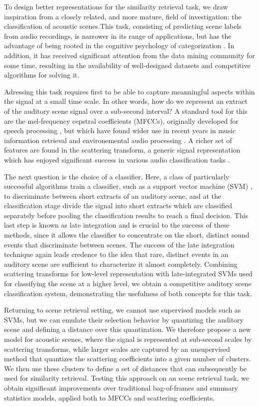 \documentclass[journal]{IEEEtran}
\begin{document}
To design better representations for the similarity retrieval task, we draw inspiration from a closely related, and more mature, field of investigation: the classification of acoustic scenes.This task, consisting of predicting scene labels from audio recordings, is narrower in its range of applications, but has the advantage of being rooted in the cognitive psychology of categorization \cite{dubois2006cognitive,guastavino_ideal_2006}. In addition, it has received significant attention from the data mining community for some time, resulting in the availability of well-designed datasets and competitive algorithms for solving it.

Adressing this task requires first to be able to capture meanningful aspects within the signal at a small time scale. In other words, how do we represent an extract of the auditory scene signal over a sub-second interval? A standard tool for this are the mel-frequency cepstral coefficients (MFCCs), originally developed for speech processing \cite{davis-mermelstein}, but which have found wider use in recent years in music information retrieval \cite{logan} and environemental audio processing \cite{aucouturier2007bag}. A richer set of features are found in the scattering transform, a generic signal representation which has enjoyed significant success in various audio classification tasks \cite{Anden2014}.

The next question is the choice of a classifier. Here, a class of particularly successful algorithms train a classifier, such as a support vector machine (SVM) \cite{cristianini2000introduction}, to discriminate between short extracts of an auditory scene, and at the classification stage divide the signal into short extracts which are classified separately before pooling the classification results to reach a final decision. This last step is known as late integration and is crucial to the success of these methods, since it allows the classifier to concentrate on the short, distinct sound events that discriminate between scenes. The success of the late integration technique again leads credence to the idea that rare, distinct events in an auditory scene are sufficient to characterize it almost completely. Combining scattering transforms for low-level representation with late-integrated SVMs used for classifying the scene at a higher level, we obtain a competitive auditory scene classification system, demonstrating the usefulness of both concepts for this task.

Returning to scene retrieval setting, we cannot use supervised models such as SVMs, but we can emulate their selection behavior by quantizing the auditory scene and defining a distance over this quantization. We therefore propose a new model for acoustic scenes, where the signal is represented at sub-second scales by scattering transforms, while larger scales are captured by an unsupervised method that quantizes the scattering coefficients into a given number of clusters. We then use these clusters to define a set of distances that can subsequently be used for similarity retrieval. Testing this approach on an scene retrieval task, we obtain significant improvements over traditional bag-of-frames and summary statistics models, applied both to MFCCs and scattering coefficients.
\end{document}
